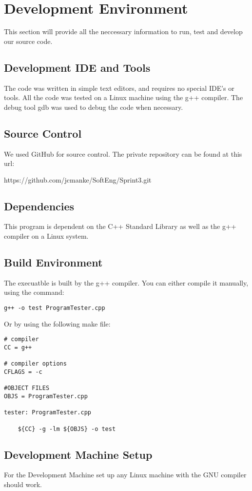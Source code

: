 \chapter{Development Environment}
This section will provide all the neccessary information to run, test and develop 
our source code.


\section{Development IDE and Tools}
The code was written in simple text editors, and requires no special IDE's or tools.  All
the code was tested on a Linux machine using the g++ compiler.  The debug tool
gdb was used to debug the code when necessary.

\section{Source  Control}
We used GitHub for source control.  The private repository can be found at this url: 

https://github.com/jcmanke/SoftEng/Sprint3.git

\section{Dependencies}
This program is dependent on the C++ Standard Library as well as the g++ compiler
on a Linux system.

\section{Build  Environment}
The execuatble is built by the g++ compiler.  You can either compile it manually, using the command:
\begin{lstlisting}
g++ -o test ProgramTester.cpp
\end{lstlisting}
Or by using the following make file:

\begin{lstlisting}
# compiler
CC = g++

# compiler options
CFLAGS = -c

#OBJECT FILES
OBJS = ProgramTester.cpp

tester: ProgramTester.cpp

	${CC} -g -lm ${OBJS} -o test
\end{lstlisting}

\section{Development Machine Setup}
For the Development Machine set up any Linux machine with the GNU compiler should work.

